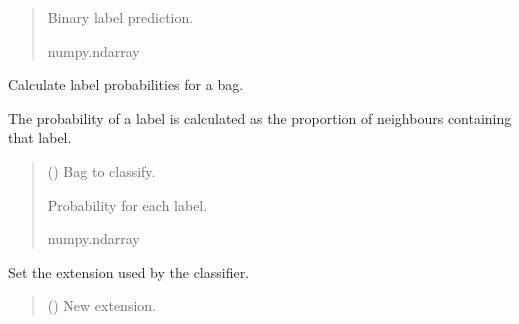 \documentclass[letterpaper,10pt,english]{sphinxmanual}
\begin{document}
\begin{fulllineitems}
\begin{fulllineitems}
\begin{quote}
\begin{description}
\sphinxAtStartPar
Binary label prediction.

\sphinxAtStartPar
numpy.ndarray

\end{description}\end{quote}

\end{fulllineitems}


\begin{fulllineitems}
\label{\detokenize{classifier/lazy/index:miml.classifier.miml.lazy.miml_br_knn.MIMLBRkNN.predict_proba_bag}}
\pysigstartsignatures
\pysiglinewithargsret
{}
{}
{}
\pysigstopsignatures
\sphinxAtStartPar
Calculate label probabilities for a bag.

\sphinxAtStartPar
The probability of a label is calculated as the proportion of
neighbours containing that label.
\begin{quote}\begin{description}
\sphinxAtStartPar
{} ({\hyperref[\detokenize{data/_autosummary/miml.data.bag.Bag:miml.data.bag.Bag}]{}}) \textendash{} Bag to classify.

\sphinxAtStartPar
Probability for each label.

\sphinxAtStartPar
numpy.ndarray

\end{description}\end{quote}

\end{fulllineitems}


\begin{fulllineitems}
\label{\detokenize{classifier/lazy/index:miml.classifier.miml.lazy.miml_br_knn.MIMLBRkNN.set_extension}}
\pysigstartsignatures
\pysiglinewithargsret
{}
{}
{}
\pysigstopsignatures
\sphinxAtStartPar
Set the extension used by the classifier.
\begin{quote}\begin{description}
\sphinxAtStartPar
{} () \textendash{} New extension.


\end{description}
\end{quote}
\end{fulllineitems}
\end{fulllineitems}
\end{document}
